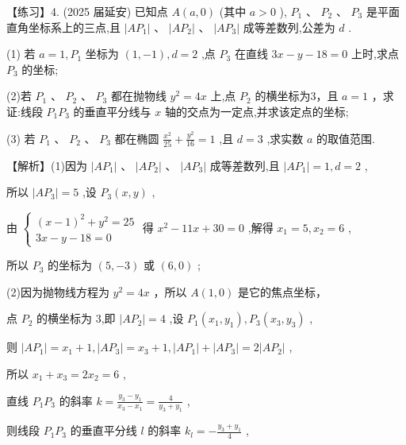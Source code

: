 \documentclass[10pt]{article}
\begin{document}
【练习】4. (2025 届延安) 已知点 \(A\left( {a,0}\right)\) (其中 \(a > 0\) ), \({P}_{1}\text{ 、 }{P}_{2}\text{ 、 }{P}_{3}\) 是平面直角坐标系上的三点,且 \(\left| {A{P}_{1}}\right|\) 、 \(\left| {A{P}_{2}}\right| \text{ 、 }\left| {A{P}_{3}}\right|\) 成等差数列,公差为 \(d\) .

(1) 若 \(a = 1,{P}_{1}\) 坐标为 \(\left( {1, - 1}\right) ,d = 2\) ,点 \({P}_{3}\) 在直线 \({3x} - y - {18} = 0\) 上时,求点 \({P}_{3}\) 的坐标;

(2)若 \({P}_{1}\text{ 、 }{P}_{2}\text{ 、 }{P}_{3}\) 都在抛物线 \({y}^{2} = {4x}\) 上,点 \({P}_{2}\) 的横坐标为3，且 \(a = 1\) ，求证:线段 \({P}_{1}{P}_{3}\) 的垂直平分线与 \(x\) 轴的交点为一定点,并求该定点的坐标;

(3) 若 \({P}_{1}\text{ 、 }{P}_{2}\text{ 、 }{P}_{3}\) 都在椭圆 \(\frac{{x}^{2}}{25} + \frac{{y}^{2}}{16} = 1\) ,且 \(d = 3\) ,求实数 \(a\) 的取值范围.

【解析】(1)因为 \(\left| {A{P}_{1}}\right| \text{ 、 }\left| {A{P}_{2}}\right| \text{ 、 }\left| {A{P}_{3}}\right|\) 成等差数列,且 \(\left| {A{P}_{1}}\right|  = 1,d = 2\) ,

所以 \(\left| {A{P}_{3}}\right|  = 5\) ,设 \({P}_{3}\left( {x,y}\right)\) ,

由 \(\left\{  \begin{array}{l} {\left( x - 1\right) }^{2} + {y}^{2} = {25} \\  {3x} - y - {18} = 0 \end{array}\right.\) 得 \({x}^{2} - {11x} + {30} = 0\) ,解得 \({x}_{1} = 5,{x}_{2} = 6\) ,

所以 \({P}_{3}\) 的坐标为 \(\left( {5, - 3}\right)\) 或 \(\left( {6,0}\right)\) ;

(2)因为抛物线方程为 \({y}^{2} = {4x}\) ，所以 \(A\left( {1,0}\right)\) 是它的焦点坐标，

点 \({P}_{2}\) 的横坐标为 3,即 \(\left| {A{P}_{2}}\right|  = 4\) ,设 \({P}_{1}\left( {{x}_{1},{y}_{1}}\right) ,{P}_{3}\left( {{x}_{3},{y}_{3}}\right)\) ,

则 \(\left| {A{P}_{1}}\right|  = {x}_{1} + 1,\left| {A{P}_{3}}\right|  = {x}_{3} + 1,\left| {A{P}_{1}}\right|  + \left| {A{P}_{3}}\right|  = 2\left| {A{P}_{2}}\right|\) ,

所以 \({x}_{1} + {x}_{3} = 2{x}_{2} = 6\) ,

直线 \({P}_{1}{P}_{3}\) 的斜率 \(k = \frac{{y}_{3} - {y}_{1}}{{x}_{3} - {x}_{1}} = \frac{4}{{y}_{3} + {y}_{1}}\) ,

则线段 \({P}_{1}{P}_{3}\) 的垂直平分线 \(l\) 的斜率 \({k}_{l} =  - \frac{{y}_{3} + {y}_{1}}{4}\) ,
\end{document}
